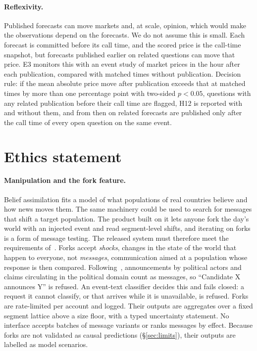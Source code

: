 \documentclass[10pt]{article}
\theoremstyle{remark}
\begin{document}
\paragraph{Reflexivity.} Published forecasts can move markets and, at scale, opinion, which would make the observations depend on the forecasts. We do not assume this is small. Each forecast is committed before its call time, and the scored price is the call-time snapshot, but forecasts published earlier on related questions can move that price. E3 monitors this with an event study of market prices in the hour after each publication, compared with matched times without publication. Decision rule: if the mean absolute price move after publication exceeds that at matched times by more than one percentage point with two-sided $p<0.05$, questions with any related publication before their call time are flagged, H12 is reported with and without them, and from then on related forecasts are published only after the call time of every open question on the same event.

\section{Ethics statement}
\label{sec:ethics}
\paragraph{Manipulation and the fork feature.} Belief assimilation fits a model of what populations of real countries believe and how news moves them. The same machinery could be used to search for messages that shift a target population. The product built on it lets anyone fork the day's world with an injected event and read segment-level shifts, and iterating on forks is a form of message testing. The released system must therefore meet the requirements of~\cite{rw_governing}. Forks accept \emph{shocks}, changes in the state of the world that happen to everyone, not \emph{messages}, communication aimed at a population whose response is then compared. Following~\cite{rw_governing}, announcements by political actors and claims circulating in the political domain count as messages, so ``Candidate X announces Y'' is refused. An event-text classifier decides this and fails closed: a request it cannot classify, or that arrives while it is unavailable, is refused. Forks are rate-limited per account and logged. Their outputs are aggregates over a fixed segment lattice above a size floor, with a typed uncertainty statement. No interface accepts batches of message variants or ranks messages by effect. Because forks are not validated as causal predictions (\S\ref{sec:limits}), their outputs are labelled as model scenarios.
\end{document}
